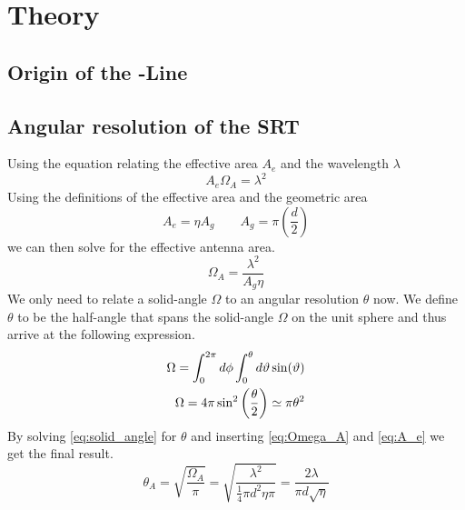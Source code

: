 
\section{Theory}




\subsection[Origin of the HI-Line]{Origin of the -Line}

\subsection{Angular resolution of the SRT}\label{sec:ang_res}
Using the equation relating the effective area $A_e$ and the wavelength $\lambda$ \cite[p. 149 (7.11)]{wilson}
\begin{equation}
    A_e \Omega_A = \lambda^2
\end{equation}
Using the definitions of the effective area and the geometric area
\begin{equation}
    A_e = \eta A_g \qquad A_g = \pi \left( \frac{d}{2} \right) \label{eq:A_e}
\end{equation}
we can then solve for the effective antenna area.
\begin{equation}
    \Omega_A = \frac{\lambda^2}{A_g \eta} \label{eq:Omega_A}
\end{equation}
We only need to relate a solid-angle $\Omega$ to an angular resolution $\theta$ now. We define $\theta$ to be the half-angle that spans the solid-angle $\Omega$ on the unit sphere and thus arrive at the following expression.
\begin{align}
    \Omega = \int_{0}^{2\pi} d\phi \int_{0}^{\theta} d\vartheta \sin(\vartheta) \notag \\
    \Omega = 4 \pi \sin^2 \left( \frac{\theta}{2} \right) \simeq \pi \theta^2 \label{eq:solid_angle}
\end{align}
By solving \eqref{eq:solid_angle} for $\theta$ and inserting \eqref{eq:Omega_A} and \eqref{eq:A_e} we get the final result.
\begin{equation}
    \theta_A = \sqrt{\frac{\Omega_A}{\pi}} = \sqrt{\frac{\lambda^2}{\frac{1}{4} \pi d^2 \eta \pi}} = \frac{2\lambda}{\pi d \sqrt{\eta}} \label{eq:half_angle}
\end{equation}

